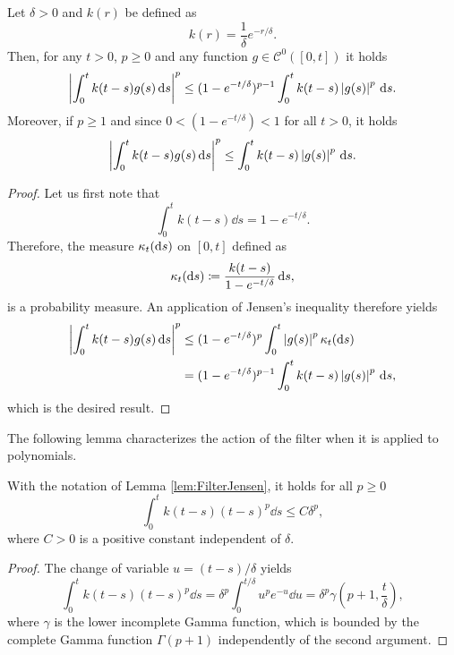 \documentclass[10pt]{article}
\begin{document}
\begin{appendices}
\begin{lemma}\label{lem:FilterJensen} Let $\delta > 0$ and $k(r)$ be defined as
	\begin{equation}
		k(r) = \frac1\delta e^{-r/\delta}.
	\end{equation}
	Then, for any $t > 0$, $p \geq 0$ and any function $g\in \mathcal C^0([0, t])$ it holds 
	\begin{equation}
		\left\lvert\int_0^t k(t-s) g(s) \,\mathrm{d} s\right\rvert^p \leq (1 - e^{-t/\delta})^{p-1}\int_0^t k(t-s) \left\lvert g(s)\right\rvert^p \,\mathrm{d} s.
	\end{equation}
	Moreover, if $p \geq 1$ and since $0 < (1-e^{-t/\delta}) < 1$ for all $t > 0$, it holds
	\begin{equation}
		\left\lvert\int_0^t k(t-s) g(s) \,\mathrm{d} s\right\rvert^p \leq \int_0^t k(t-s) \left\lvert g(s)\right\rvert^p \,\mathrm{d} s.
	\end{equation}
\end{lemma}
\begin{proof} Let us first note that
	\begin{equation}
		\int_0^t k(t-s) \dd s = 1 - e^{-t/\delta}.
	\end{equation}
	Therefore, the measure $\kappa_t(\mathrm{d} s)$ on $[0, t]$ defined as
	\begin{equation}
		\kappa_t(\mathrm{d} s) \coloneqq \frac{k(t-s)}{1 - e^{-t/\delta}} \,\mathrm{d} s,
	\end{equation}
	is a probability measure. An application of Jensen's inequality therefore yields
	\begin{equation}
	\begin{aligned}
		\left\lvert\int_0^t k(t-s) g(s) \,\mathrm{d} s\right\rvert^p &\leq (1 - e^{-t/\delta})^p \int_0^t \left\lvert g(s)\right\rvert^p \kappa_t(\mathrm{d} s) \\
		&= (1 - e^{-t/\delta})^{p-1} \int_0^t k(t-s) \left\lvert g(s)\right\rvert^p \,\mathrm{d} s,
	\end{aligned}
	\end{equation}
	which is the desired result.
\end{proof}

The following lemma characterizes the action of the filter when it is applied to polynomials.
\begin{lemma}\label{lem:FilterPoly} With the notation of Lemma \ref{lem:FilterJensen}, it holds for all $p \geq 0$
	\begin{equation}
		\int_0^t k(t-s)(t-s)^p \dd s \leq C \delta^p,
	\end{equation}
	where $C > 0$ is a positive constant independent of $\delta$.
\end{lemma}
\begin{proof} The change of variable $u = (t-s)/\delta$ yields
	\begin{equation}
		\int_0^t k(t-s)(t-s)^p \dd s = \delta^p \int_0^{t/\delta} u^p e^{-u} \dd u = \delta^p \gamma\left(p+1, \frac{t}{\delta}\right),
	\end{equation}
	where $\gamma$ is the lower incomplete Gamma function, which is bounded by the complete Gamma function $\Gamma(p+1)$ independently of the second argument.
\end{proof}


\end{appendices}
\end{document}
